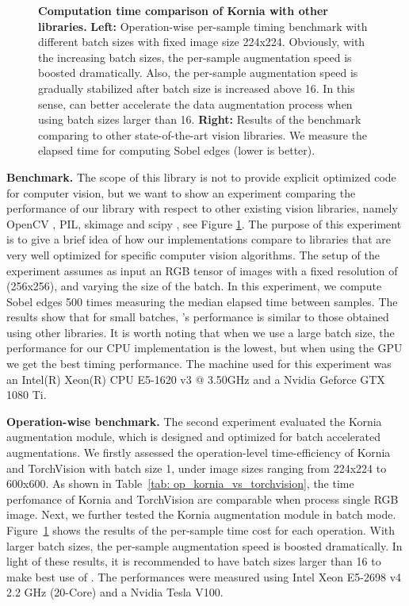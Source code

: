 \begin{figure}
\begin{minipage}{.5\textwidth}
\end{minipage}
\caption{{\bf Computation time comparison of Kornia with other libraries. }\textbf{Left:} Operation-wise per-sample timing benchmark with different batch sizes with fixed image size 224x224. Obviously, with the increasing batch sizes, the per-sample augmentation speed is boosted dramatically. Also, the per-sample augmentation speed is gradually stabilized after batch size is increased above 16. In this sense, \lib{} can better accelerate the data augmentation process when using batch sizes larger than 16. \textbf{Right:} Results of the benchmark comparing \lib{} to other state-of-the-art vision libraries. We measure the elapsed time for computing Sobel edges (lower is better).}
\label{fig:op_benchmark}
\end{figure}

\textbf{Benchmark.} The scope of this library is not to provide explicit optimized code for computer vision, but we want to show an experiment comparing the performance of our library with respect to other existing vision libraries, namely OpenCV \citep{opencv}, PIL, skimage \citep{scikit-image} and scipy \citep{scikit-learn}, see Figure \ref{fig:op_benchmark}. The purpose of this experiment is to give a brief idea of how our implementations compare to libraries that are very well optimized for specific computer vision algorithms. The setup of the experiment assumes as input an RGB tensor of images with a fixed resolution of (256x256), and varying the size of the batch. In this experiment, we compute Sobel edges 500 times measuring the median elapsed time between samples. The results show that for small batches, \lib's performance is similar to those obtained using  other libraries. It is worth noting that when we use a large batch size, the performance for our CPU implementation is the lowest, but when using the GPU we get the best timing performance. The machine used for this experiment was an Intel(R) Xeon(R) CPU E5-1620 v3 @ 3.50GHz and a Nvidia Geforce GTX 1080 Ti.

\textbf{Operation-wise benchmark.} The second experiment evaluated the  Kornia augmentation module, which is designed and optimized for batch accelerated augmentations. We firstly assessed the operation-level time-efficiency of Kornia and TorchVision with batch size 1, under   image sizes ranging from 224x224 to 600x600. As shown in Table~\ref{tab: op_kornia_vs_torchvision}, the time perfomance of Kornia and TorchVision are comparable when process single RGB image. Next, we further tested the Kornia augmentation module in batch mode. Figure~\ref{fig:op_benchmark} shows the results of the per-sample time cost for each operation. With  larger batch sizes, the per-sample augmentation speed is boosted dramatically. In light of these  results, it is recommended to have batch sizes larger than 16 to make best use of \lib{}. The performances were measured using Intel Xeon E5-2698 v4 2.2 GHz (20-Core) and a Nvidia Tesla V100.


